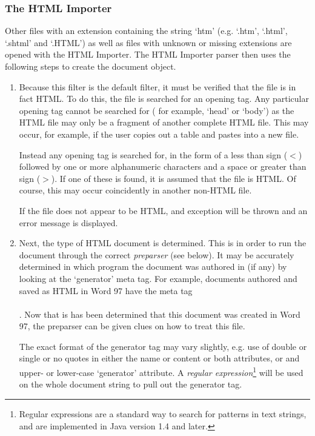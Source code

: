 \subsubsection{The HTML Importer}

Other files with an extension containing the string `htm' (e.g. `.htm',
`.html', `.shtml' and `.HTML') as well as files with unknown or missing
extensions are opened with the HTML Importer. The HTML Importer parser then
uses the following steps to create the document object.

\begin{enumerate}

\item Because this filter is the default filter, it must be verified that the file
is in fact HTML. To do this, the file is searched for an opening tag.  Any
particular opening tag cannot be searched for ( for example, `head' or `body')
as the HTML file may only be a fragment of another complete HTML file. This may
occur, for example, if the user copies out a table and pastes into a new file. 

Instead any opening tag is searched for, in the form of a less than sign ($<$)
followed by one or more alphanumeric characters and a space or greater than
sign ($>$). If one of these is found, it is assumed that the file is HTML. Of
course, this may occur coincidently in another non-HTML file. 

If the file does not appear to be HTML, and exception will be thrown and an
error message is displayed.

\item Next, the type of HTML document is determined. This is in order to run the
document through the correct \emph{preparser} (see below). It may be accurately
determined in which program the document was authored in (if any) by looking at
the `generator' meta tag. For example, documents authored and saved as HTML in
Word 97 have the meta tag\\ \\. Now that is has been determined that this document was created in
Word 97, the preparser can be given clues on how to treat this file.

The exact format of the generator tag may vary slightly, e.g. use of double or
single or no quotes in either the name or content or both attributes, or and
upper- or lower-case `generator' attribute. A \emph{regular
expression}\footnote{Regular expressions are a standard way to search for
patterns in text strings, and are implemented in Java version 1.4 and later.}
will be used on the whole document string to pull out the generator tag.


\end{enumerate}
